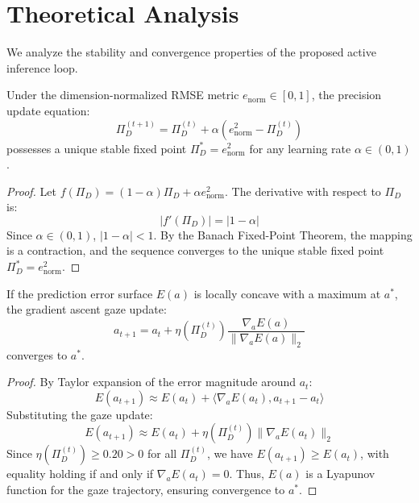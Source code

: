 \section{Theoretical Analysis}
We analyze the stability and convergence properties of the proposed active inference loop.

\begin{theorem}
Under the dimension-normalized RMSE metric $e_{\text{norm}} \in [0, 1]$, the precision update equation:
\begin{equation}
\Pi_D^{(t+1)} = \Pi_D^{(t)} + \alpha (e_{\text{norm}}^2 - \Pi_D^{(t)})
\end{equation}
possesses a unique stable fixed point $\Pi_D^* = e_{\text{norm}}^2$ for any learning rate $\alpha \in (0, 1)$.
\end{theorem}

\begin{proof}
Let $f(\Pi_D) = (1 - \alpha)\Pi_D + \alpha e_{\text{norm}}^2$. The derivative with respect to $\Pi_D$ is:
\begin{equation}
|f'(\Pi_D)| = |1 - \alpha|
\end{equation}
Since $\alpha \in (0, 1)$, $|1 - \alpha| < 1$. By the Banach Fixed-Point Theorem, the mapping is a contraction, and the sequence converges to the unique stable fixed point $\Pi_D^* = e_{\text{norm}}^2$.
\end{proof}

\begin{lemma}
If the prediction error surface $E(a)$ is locally concave with a maximum at $a^*$, the gradient ascent gaze update:
\begin{equation}
a_{t+1} = a_t + \eta(\Pi_D^{(t)}) \frac{\nabla_a E(a)}{\parallel \nabla_a E(a) \parallel_2}
\end{equation}
converges to $a^*$.
\end{lemma}

\begin{proof}
By Taylor expansion of the error magnitude around $a_t$:
\begin{equation}
E(a_{t+1}) \approx E(a_t) + \langle \nabla_a E(a_t), a_{t+1} - a_t \rangle
\end{equation}
Substituting the gaze update:
\begin{equation}
E(a_{t+1}) \approx E(a_t) + \eta(\Pi_D^{(t)}) \| \nabla_a E(a_t) \|_2
\end{equation}
Since $\eta(\Pi_D^{(t)}) \ge 0.20 > 0$ for all $\Pi_D^{(t)}$, we have $E(a_{t+1}) \ge E(a_t)$, with equality holding if and only if $\nabla_a E(a_t) = 0$. Thus, $E(a)$ is a Lyapunov function for the gaze trajectory, ensuring convergence to $a^*$.
\end{proof}

